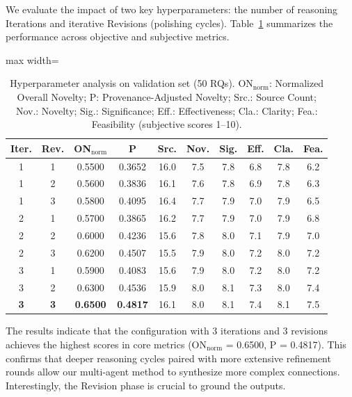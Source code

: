 \documentclass[runningheads]{llncs}
\begin{document}
We evaluate the impact of two key hyperparameters: the number of reasoning Iterations and iterative Revisions (polishing cycles). Table~\ref{tab:hyperparam_results} summarizes the performance across objective and subjective metrics.

\begin{table}[t]
\centering
\small
\begin{adjustbox}{max width=\textwidth}
\begin{tabular}{cccccccccc}
\toprule
\textbf{Iter.} & \textbf{Rev.} & \textbf{ON$_{\text{norm}}$} & \textbf{P} & \textbf{Src.} & \textbf{Nov.} & \textbf{Sig.} & \textbf{Eff.} & \textbf{Cla.} & \textbf{Fea.} \\
\midrule
1 & 1 & 0.5500 & 0.3652 & 16.0 & 7.5 & 7.8 & 6.8 & 7.8 & 6.2 \\
1 & 2 & 0.5600 & 0.3836 & 16.1 & 7.6 & 7.8 & 6.9 & 7.8 & 6.3 \\
1 & 3 & 0.5800 & 0.4095 & 16.4 & 7.7 & 7.9 & 7.0 & 7.9 & 6.5 \\
2 & 1 & 0.5700 & 0.3865 & 16.2 & 7.7 & 7.9 & 7.0 & 7.9 & 6.8 \\
2 & 2 & 0.6000 & 0.4236 & 15.6 & 7.8 & 8.0 & 7.1 & 7.9 & 7.0 \\
2 & 3 & 0.6200 & 0.4507 & 15.5 & 7.9 & 8.0 & 7.2 & 8.0 & 7.2 \\
3 & 1 & 0.5900 & 0.4083 & 15.6 & 7.9 & 8.0 & 7.2 & 8.0 & 7.2 \\
3 & 2 & 0.6300 & 0.4536 & 15.9 & 8.0 & 8.1 & 7.3 & 8.0 & 7.4 \\
\textbf{3} & \textbf{3} & \textbf{0.6500} & \textbf{0.4817} & 16.1 & 8.0 & 8.1 & 7.4 & 8.1 & 7.5 \\
\bottomrule
\end{tabular}
\end{adjustbox}
\caption{Hyperparameter analysis on validation set (50 RQs). ON$_{\text{norm}}$: Normalized Overall Novelty; P: Provenance-Adjusted Novelty; Src.: Source Count; Nov.: Novelty; Sig.: Significance; Eff.: Effectiveness; Cla.: Clarity; Fea.: Feasibility (subjective scores 1--10).}
\label{tab:hyperparam_results}
\end{table}

The results indicate that the configuration with 3 iterations and 3 revisions achieves the highest scores in core metrics (ON$_{\text{norm}}$ = 0.6500, P = 0.4817). This confirms that deeper reasoning cycles paired with more extensive refinement rounds allow our multi-agent method to synthesize more complex connections. Interestingly, the Revision phase is crucial to ground the outputs.
\end{document}
